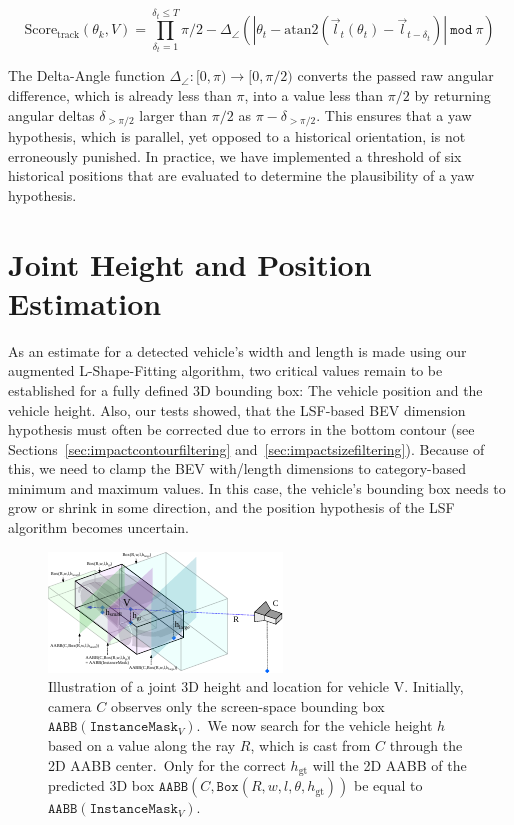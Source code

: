 \[
    \text{Score}_\text{track}(\theta_k, V)=\prod_{\delta_t=1}^{\delta_t \leq T}\pi/2 - \Delta_\angle(|\theta_{t} - \text{atan2}(\vec{l}_t(\theta_t)-\vec{l}_{t-\delta_t})| \mathtt{~mod~}\pi)
\]

The Delta-Angle function $\Delta_\angle: [0, \pi) \rightarrow [0, \pi/2)$ converts the passed raw angular difference, which is already less than $\pi$, into a value less than $\pi/2$ by returning angular deltas $\delta_{>\pi/2}$ larger than $\pi/2$ as $\pi-\delta_{>\pi/2}$.
This ensures that a yaw hypothesis, which is parallel, yet opposed to a historical orientation, is not erroneously punished.
In practice, we have implemented a threshold of six historical positions that are evaluated to determine the plausibility of a yaw hypothesis.


\section{Joint Height and Position Estimation}
\label{sec:sizeandpos}

As an estimate for a detected vehicle's width and length is made using our augmented L-Shape-Fitting algorithm, two critical values remain to be established for a fully defined 3D bounding box: The vehicle position and the vehicle height.
Also, our tests showed, that the LSF-based BEV dimension hypothesis must often be corrected due to errors in the bottom contour (see Sections~\ref{sec:impactcontourfiltering} and~\ref{sec:impactsizefiltering}).
Because of this, we need to clamp the BEV with/length dimensions to category-based minimum and maximum values.
In this case, the vehicle's bounding box needs to grow or shrink in some direction, and the position hypothesis of the LSF algorithm becomes uncertain.

\begin{figure}[htb]
    \centering
    \includegraphics[width=1.0\linewidth]{figures/calc-height-pos}
    \caption{Illustration of a joint 3D height and location for vehicle V. Initially, camera $C$ observes only the screen-space bounding box $\mathtt{AABB}(\texttt{InstanceMask}_V)$.\ We now search for the vehicle height $h$ based on a value along the ray $R$, which is cast from $C$ through the 2D AABB center.\ Only for the correct $h_\text{gt}$ will the 2D AABB of the predicted 3D box $\mathtt{AABB}(C,\mathtt{Box}(R,w,l,\theta,h_\text{gt}))$ be equal to $\mathtt{AABB}(\texttt{InstanceMask}_V)$.}
    \label{fig:calcheightpos}
\end{figure}

